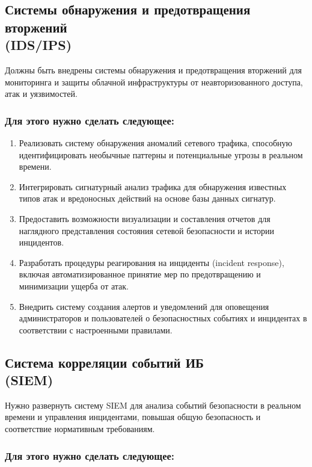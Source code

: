 \documentclass[14pt, a4paper]{extarticle}
\begin{document}
\subsection{Системы обнаружения и предотвращения вторжений\\ (IDS/IPS)}

Должны быть внедрены системы обнаружения и предотвращения вторжений для мониторинга и защиты облачной инфраструктуры от неавторизованного доступа, атак и уязвимостей.

\subsubsection*{Для этого нужно сделать следующее:}

\begin{enumerate}
\item Реализовать систему обнаружения аномалий сетевого трафика, способную идентифицировать необычные паттерны и потенциальные угрозы в реальном времени.
\item Интегрировать сигнатурный анализ трафика для обнаружения известных типов атак и вредоносных действий на основе базы данных сигнатур.
\item Предоставить возможности визуализации и составления отчетов для наглядного представления состояния сетевой безопасности и истории инцидентов.
\item Разработать процедуры реагирования на инциденты (incident response), включая автоматизированное принятие мер по предотвращению и минимизации ущерба от атак.
\item Внедрить систему создания алертов и уведомлений для оповещения администраторов и пользователей о безопасностных событиях и инцидентах в соответствии с настроенными правилами.
\end{enumerate}

\subsection{Система корреляции событий ИБ\\ (SIEM)}

Нужно развернуть систему SIEM для анализа событий безопасности в реальном времени и управления инцидентами, повышая общую безопасность и соответствие нормативным требованиям.

\subsubsection*{Для этого нужно сделать следующее:}
\end{document}
